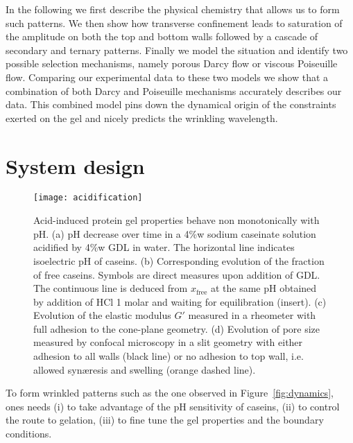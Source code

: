 \documentclass[twocolumn,superscriptaddress,showpacs,preprintnumbers,
amsmath,amssymb,prl]{revtex4-1}
\begin{document}
In the following we first describe the physical chemistry that allows us to form such patterns.
We then show how transverse confinement leads to saturation of the amplitude on both the top and bottom walls followed by a cascade of secondary and ternary patterns. Finally we model the situation and identify two possible selection mechanisms, namely porous Darcy flow or viscous Poiseuille flow. Comparing our experimental data to these two models we show that a combination of both Darcy and Poiseuille mechanisms accurately describes our data. This combined model pins down the dynamical origin of the constraints exerted on the gel and nicely predicts the wrinkling wavelength.

\section*{System design}

\begin{figure}
	\texttt{[image: acidification]}%
	\caption{Acid-induced protein gel properties behave non monotonically with pH. (a) pH decrease over time in a 4\%w sodium caseinate solution acidified by 4\%w GDL in water. The horizontal line indicates isoelectric pH of caseins. (b) Corresponding evolution of the fraction of free caseins. Symbols are direct measures upon addition of GDL. The continuous line is deduced from $x_\text{free}$ at the same pH obtained by addition of HCl 1 molar and waiting for equilibration (insert). (c) Evolution of the elastic modulus $G'$ measured in a rheometer with full adhesion to the cone-plane geometry. (d) Evolution of pore size measured by confocal microscopy in a slit geometry with either adhesion to all walls (black line) or no adhesion to top wall, i.e. allowed syn\ae{}resis and swelling (orange dashed line).}%
	\label{fig:acidification}
\end{figure}


To form wrinkled patterns such as the one observed in Figure~\ref{fig:dynamics}, ones needs (i) to take advantage of the pH sensitivity of caseins, (ii) to control the route to gelation, (iii) to fine tune the gel properties and the boundary conditions.
\end{document}
